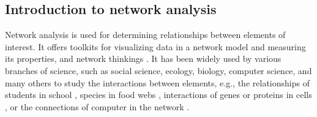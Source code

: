 \documentclass[12pt, oneside]{report}
\begin{document}
\subsection*{Introduction to network analysis}
Network analysis is used for determining relationships between elements of interest. It offers toolkits for visualizing data in a network model and measuring its properties, and network thinkings \citep{PROULX:2005hx}. It has been widely used by various branches of science, such as social science, ecology, biology, computer science, and many others to study the interactions between elements, e.g., the relationships of students in school \citep{moody2001race}, species in food webs \citep{krause2003compartments}, interactions of genes or proteins in cells \citep{guimera2005functional}, or the connections of computer in the network \citep{pastor2001epidemic, newman2006modularity}.
\end{document}
